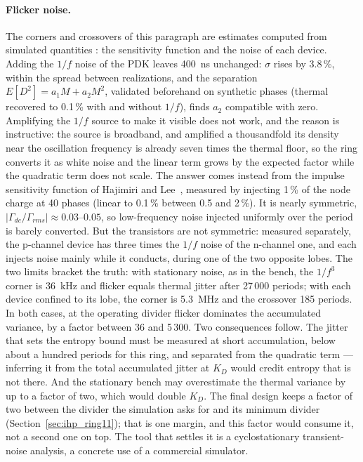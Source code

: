 \paragraph{Flicker noise.} The corners and crossovers of this paragraph
are estimates \est{} computed from simulated quantities \simu{}: the
sensitivity function and the noise of each device. Adding the $1/f$ noise
of the \ac{PDK} leaves 400~ns unchanged: $\sigma$ rises by 3.8\,\%, within the spread between
realizations, and the separation $E[D^2] = a_1 M + a_2 M^2$, validated
beforehand on synthetic phases (thermal recovered to 0.1\,\% with and
without $1/f$), finds $a_2$ compatible with zero. Amplifying the $1/f$
source to make it visible does not work, and the reason is instructive:
the source is broadband, and amplified a thousandfold its density near
the oscillation frequency is already seven times the thermal floor, so
the ring converts it as white noise and the linear term grows by the
expected factor while the quadratic term does not scale. The answer comes
instead from the impulse sensitivity function of Hajimiri and
Lee~\cite{hajimiri_1998_general}, measured by injecting 1\,\% of the node
charge at 40 phases (linear to 0.1\,\% between 0.5 and 2\,\%). It is
nearly symmetric, $|\Gamma_{dc}/\Gamma_{rms}| \approx 0.03$--$0.05$, so
low-frequency noise injected uniformly over the period is barely
converted. But the transistors are not symmetric: measured separately,
the p-channel device has three times the $1/f$ noise of the n-channel
one, and each injects noise mainly while it conducts, during one of the
two opposite lobes. The two limits bracket the truth: with stationary
noise, as in the bench, the $1/f^3$ corner is 36~kHz and flicker equals
thermal jitter after 27\,000 periods; with each device confined to its
lobe, the corner is 5.3~MHz and the crossover 185 periods. In both cases,
at the operating divider flicker dominates the accumulated variance, by a
factor between 36 and 5\,300. Two consequences follow. The jitter that
sets the entropy bound must be measured at short accumulation, below
about a hundred periods for this ring, and separated from the quadratic
term --- inferring it from the total accumulated jitter at $K_D$ would
credit entropy that is not there. And the stationary bench may
overestimate the thermal variance by up to a factor of two, which would
double $K_D$. The final design keeps a factor of two between the divider
the simulation asks for and its minimum divider
(Section~\ref{sec:ihp_ring11}); that is one margin, and this factor
would consume it, not a second one on top. The tool that settles it is a
cyclostationary transient-noise analysis, a concrete use of a commercial
simulator.

